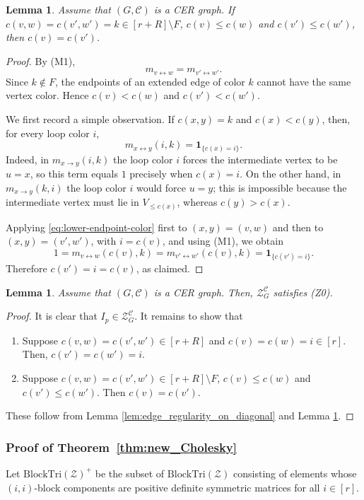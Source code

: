 \documentclass[12pt]{amsart}
\theoremstyle{plain}
\newtheorem{lemma}[theorem]{Lemma}
\theoremstyle{definition}
\theoremstyle{remark}
\newcommand{\1}{\mathbf{1}}
\newcommand{\coloredZ}{\mathcal{Z}_{G}^{\mathcal{C}}}
\newcommand{\tri}{\mathrm{BlockTri}}
\begin{document}
\begin{lemma}\label{lem:L_i}
Assume that $(G,\mathcal{C})$ is a CER graph. If $c(v,w)=c(v',w')=k\in [r+R]\setminus F$, $c(v)\le c(w)$ and $c(v')\le c(w')$, then $c(v)=c(v')$.
\end{lemma}
\begin{proof}
By (M1),
\[
m_{v\leftrightarrow w} = m_{v'\leftrightarrow w'}.
\]
Since $k\notin F$, the endpoints of an extended edge of color $k$ cannot have the same vertex color. Hence $c(v)<c(w)$ and $c(v')<c(w')$.

We first record a simple observation. If $c(x,y)=k$ and $c(x)<c(y)$, then, for every loop color $i$,
\begin{equation}\label{eq:lower-endpoint-color}
m_{x\leftrightarrow y}(i,k)=\1_{\{c(x)=i\}}.
\end{equation}
Indeed, in $m_{x\to y}(i,k)$ the loop color $i$ forces the intermediate vertex to be $u=x$, so this term equals $1$ precisely when $c(x)=i$. On the other hand, in $m_{x\to y}(k,i)$ the loop color $i$ would force $u=y$; this is impossible because the intermediate vertex must lie in $V_{\le c(x)}$, whereas $c(y)>c(x)$.

Applying \eqref{eq:lower-endpoint-color} first to $(x,y)=(v,w)$ and then to $(x,y)=(v',w')$, with $i=c(v)$, and using (M1), we obtain
\[
1=m_{v\leftrightarrow w}(c(v),k)
=m_{v'\leftrightarrow w'}(c(v),k)
=\1_{\{c(v')=i\}}.
\]
Therefore $c(v')=i=c(v)$, as claimed.
\end{proof}

\begin{lemma}\label{lem:Z0}
Assume that $(G,\mathcal{C})$ is a CER graph. Then, $\coloredZ$ satisfies (Z0). 
\end{lemma}
\begin{proof}
It is clear that $I_p\in\coloredZ$. It remains to show that
\begin{enumerate}
    \item Suppose $c(v,w)=c(v',w')\in[r+R]$ and $c(v)=c(w)=i\in[r]$. Then, $c(v')=c(w')=i$.
    \item Suppose $c(v,w)=c(v',w')\in [r+R]\setminus F$, $c(v)\le c(w)$ and $c(v')\le c(w')$. Then $c(v)=c(v')$.
\end{enumerate}
These follow from Lemma \ref{lem:edge_regularity_on_diagonal} and Lemma \ref{lem:L_i}.
\end{proof}



\subsubsection{Proof of Theorem~\ref{thm:new_Cholesky}}
Let $\tri(\mathcal{Z})^+$ 
 be the subset of $\tri(\mathcal{Z})$ 
 consisting of elements whose $(i,i)$-block components
 are positive definite symmetric matrices for all $i\in[r]$.
\end{document}
